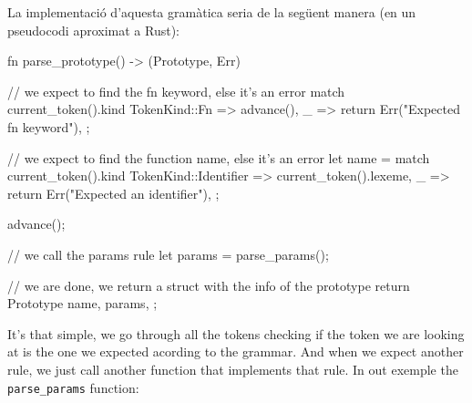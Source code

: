 ﻿\documentclass{article}
\begin{document}
                La implementació d'aquesta gramàtica seria de la següent manera
                (en un pseudocodi aproximat a Rust):

                \begin{code}
                fn parse_prototype() -> (Prototype, Err) {
                    // we expect to find the fn keyword, else it's an error
                    match current_token().kind {
                        TokenKind::Fn => advance(),
                        _ => return Err("Expected fn keyword"),
                    };

                    // we expect to find the function name, else it's an error
                    let name = match current_token().kind {
                        TokenKind::Identifier => current_token().lexeme,
                        _ => return Err("Expected an identifier"),
                    };

                    advance();

                    // we call the params rule
                    let params = parse_params();

                    // we are done, we return a struct with the info of the prototype
                    return Prototype { 
                        name,
                        params,
                    };
                }
                \end{code}

                It's that simple, we go through all the tokens checking if the 
                token we are looking at is the one we expected acording to the
                grammar. And when we expect another rule, we just call another
                function that implements that rule. In out exemple the 
                \texttt{parse\_params} function:
\end{document}
